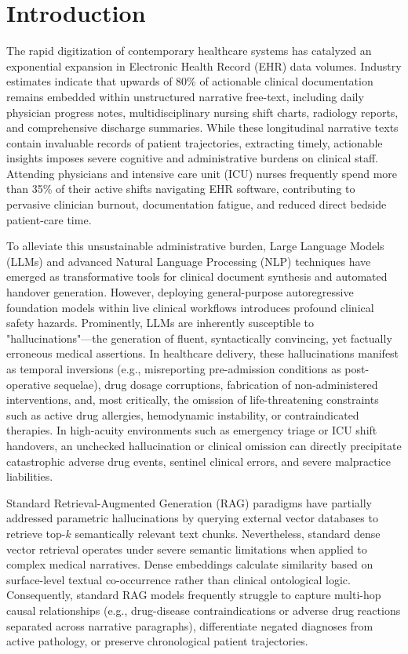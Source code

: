 \documentclass[11pt, a4paper]{article}
\begin{document}
\section{Introduction}
The rapid digitization of contemporary healthcare systems has catalyzed an exponential expansion in Electronic Health Record (EHR) data volumes. Industry estimates indicate that upwards of 80\% of actionable clinical documentation remains embedded within unstructured narrative free-text, including daily physician progress notes, multidisciplinary nursing shift charts, radiology reports, and comprehensive discharge summaries. While these longitudinal narrative texts contain invaluable records of patient trajectories, extracting timely, actionable insights imposes severe cognitive and administrative burdens on clinical staff. Attending physicians and intensive care unit (ICU) nurses frequently spend more than 35\% of their active shifts navigating EHR software, contributing to pervasive clinician burnout, documentation fatigue, and reduced direct bedside patient-care time.

To alleviate this unsustainable administrative burden, Large Language Models (LLMs) and advanced Natural Language Processing (NLP) techniques have emerged as transformative tools for clinical document synthesis and automated handover generation. However, deploying general-purpose autoregressive foundation models within live clinical workflows introduces profound clinical safety hazards. Prominently, LLMs are inherently susceptible to "hallucinations"—the generation of fluent, syntactically convincing, yet factually erroneous medical assertions. In healthcare delivery, these hallucinations manifest as temporal inversions (e.g., misreporting pre-admission conditions as post-operative sequelae), drug dosage corruptions, fabrication of non-administered interventions, and, most critically, the omission of life-threatening constraints such as active drug allergies, hemodynamic instability, or contraindicated therapies. In high-acuity environments such as emergency triage or ICU shift handovers, an unchecked hallucination or clinical omission can directly precipitate catastrophic adverse drug events, sentinel clinical errors, and severe malpractice liabilities.

Standard Retrieval-Augmented Generation (RAG) paradigms have partially addressed parametric hallucinations by querying external vector databases to retrieve top-$k$ semantically relevant text chunks. Nevertheless, standard dense vector retrieval operates under severe semantic limitations when applied to complex medical narratives. Dense embeddings calculate similarity based on surface-level textual co-occurrence rather than clinical ontological logic. Consequently, standard RAG models frequently struggle to capture multi-hop causal relationships (e.g., drug-disease contraindications or adverse drug reactions separated across narrative paragraphs), differentiate negated diagnoses from active pathology, or preserve chronological patient trajectories.
\end{document}
